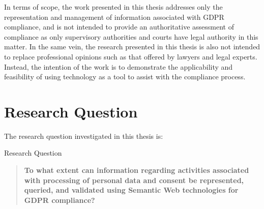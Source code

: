 
In terms of scope, the work presented in this thesis addresses only the representation and management of information associated with GDPR compliance, and is not intended to provide an authoritative assessment of compliance as only supervisory authorities and courts have legal authority in this matter.
In the same vein, the research presented in this thesis is also not intended to replace professional opinions such as that offered by lawyers and legal experts.
Instead, the intention of the work is to demonstrate the applicability and feasibility of using technology as a tool to assist with the compliance process.

\section{Research Question}\label{sec:intro:RQ}
The research question investigated in this thesis is:
\begin{framed}
\small{Research Question}
\begin{quote}
\textbf{To what extent can information regarding activities associated with processing of personal data and consent be represented, queried, and validated using Semantic Web technologies for GDPR compliance?}
\end{quote}
\end{framed}

